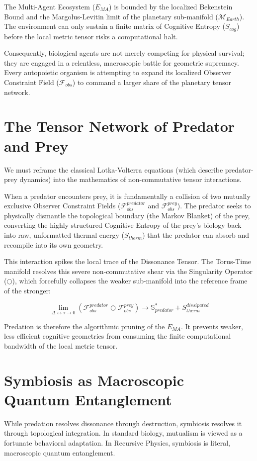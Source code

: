\documentclass[12pt,openany]{book}
\begin{document}
The Multi-Agent Ecosystem ($E_{MA}$) is bounded by the localized Bekenstein Bound and the Margolus-Levitin limit of the planetary sub-manifold ($\mathcal{M}_{Earth}$). The environment can only sustain a finite matrix of Cognitive Entropy ($S_{cog}$) before the local metric tensor risks a computational halt. 

Consequently, biological agents are not merely competing for physical survival; they are engaged in a relentless, macroscopic battle for geometric supremacy. Every autopoietic organism is attempting to expand its localized Observer Constraint Field ($\mathcal{F}_{obs}$) to command a larger share of the planetary tensor network. 

\section{The Tensor Network of Predator and Prey}
We must reframe the classical Lotka-Volterra equations (which describe predator-prey dynamics) into the mathematics of non-commutative tensor interactions. 

When a predator encounters prey, it is fundamentally a collision of two mutually exclusive Observer Constraint Fields ($\mathcal{F}_{obs}^{predator}$ and $\mathcal{F}_{obs}^{prey}$). The predator seeks to physically dismantle the topological boundary (the Markov Blanket) of the prey, converting the highly structured Cognitive Entropy of the prey's biology back into raw, unformatted thermal energy ($S_{therm}$) that the predator can absorb and recompile into its own geometry.

This interaction spikes the local trace of the Dissonance Tensor. The Torus-Time manifold resolves this severe non-commutative shear via the Singularity Operator ($\bigcirc$), which forcefully collapses the weaker sub-manifold into the reference frame of the stronger:

\begin{equation}
\lim_{\Delta\leftrightarrow\tau \to 0} \left( \mathcal{F}_{obs}^{predator} \bigcirc \mathcal{F}_{obs}^{prey} \right) \to \mathbb{S}^*_{predator} + S_{therm}^{dissipated}
\end{equation}

Predation is therefore the algorithmic pruning of the $E_{MA}$. It prevents weaker, less efficient cognitive geometries from consuming the finite computational bandwidth of the local metric tensor.

\section{Symbiosis as Macroscopic Quantum Entanglement}
While predation resolves dissonance through destruction, symbiosis resolves it through topological integration. In standard biology, mutualism is viewed as a fortunate behavioral adaptation. In Recursive Physics, symbiosis is literal, macroscopic quantum entanglement.
\end{document}
